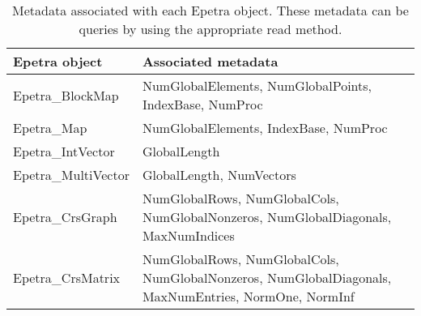 \documentclass[11pt,relax]{SANDreport}
\begin{document}
\begin{table}
\begin{center}
\begin{tabular}{|l | p{10cm} |}
\hline
Epetra object & Associated metadata \\
\hline
Epetra\_BlockMap & NumGlobalElements,
                   NumGlobalPoints,
                   IndexBase,
                   NumProc \\
\hline
Epetra\_Map & NumGlobalElements,
              IndexBase,
              NumProc \\
\hline
Epetra\_IntVector & GlobalLength \\
    \hline
Epetra\_MultiVector & GlobalLength,
                      NumVectors \\
\hline
Epetra\_CrsGraph & NumGlobalRows,
                   NumGlobalCols,
                   NumGlobalNonzeros,
                   NumGlobalDiagonals,
                   MaxNumIndices\\
\hline
Epetra\_CrsMatrix & NumGlobalRows,
                    NumGlobalCols,
                    NumGlobalNonzeros,
                    NumGlobalDiagonals,
                    MaxNumEntries,
                    NormOne,
                    NormInf \\
\hline
\end{tabular}
\caption{Metadata associated with each  Epetra object. These metadata can be
  queries by using the appropriate read method.}
\label{tab:metadata}
\end{center}
\end{table}
\end{document}
